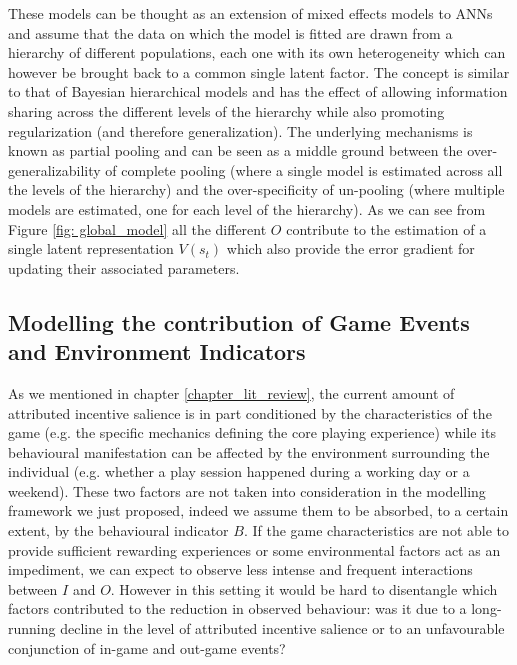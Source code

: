 These models can be thought as an extension of mixed effects models \cite{crawley2007mixed} to ANNs and assume that the data on which the model is fitted are drawn from a hierarchy of different populations, each one with its own heterogeneity which can however be brought back to a common single latent factor. The concept is similar to that of Bayesian hierarchical models \cite{gelman2020bayesian} and has the effect of allowing information sharing across the different levels of the hierarchy while also promoting regularization (and therefore generalization)\cite{gelman2020bayesian}. The underlying mechanisms is known as partial pooling \cite{gelman2020bayesian} and can be seen as a middle ground between the over-generalizability of complete pooling (where a single model is estimated across all the levels of the hierarchy) and the over-specificity of un-pooling (where multiple models are estimated, one for each level of the hierarchy). As we can see from Figure \ref{fig: global_model} all the different $O$ contribute to the estimation of a single latent representation $V(s_t)$ which also provide the error gradient for updating their associated parameters.

\subsection{Modelling the contribution of Game Events and Environment Indicators}
\label{modelling_env_and_game_elements}
As we mentioned in chapter \ref{chapter_lit_review}, the current amount of attributed incentive salience is in part conditioned by the characteristics of the game (e.g. the specific mechanics defining the core playing experience) while its behavioural manifestation can be affected by the environment surrounding the individual (e.g. whether a play session happened during a working day or a weekend). These two factors are not taken into consideration in the modelling framework we just proposed, indeed we assume them to be absorbed, to a certain extent, by the behavioural indicator $B$. If the game characteristics are not able to provide sufficient rewarding experiences or some environmental factors act as an impediment, we can expect to observe less intense and frequent interactions between $I$ and $O$. However in this setting it would be hard to disentangle which factors contributed to the reduction in observed behaviour: was it due to a long-running decline in the level of attributed incentive salience or to an unfavourable conjunction of in-game and out-game events? 

